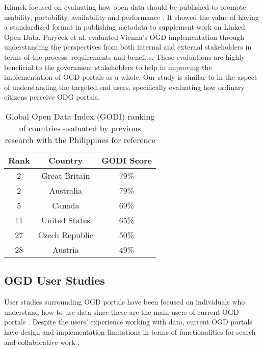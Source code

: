 \documentclass{sigchi}
\begin{document}
Kl{\'\i}mek focused on evaluating how open data should be published to promote usability, portability, availability and performance \cite{klimek2019dcat}. It showed the value of having a standardized format in publishing metadata to supplement work on Linked Open Data. Parycek et al. \cite{Parycek2014} evaluated Vienna's OGD implementation through understanding the perspectives from both internal and external stakeholders in terms of the process, requirements and benefits. These evaluations are highly beneficial to the government stakeholders to help in improving the implementation of OGD portals as a whole. Our study is similar to \cite{Parycek2014} in the aspect of understanding the targeted end users, specifically evaluating how ordinary citizens perceive ODG portals.

\begin{table}
    \centering
    \begin{tabular}{c c c}
         \textbf{Rank} & \textbf{Country} & \textbf{GODI Score} \\
         \midrule
         2 & Great Britain & 79\% \\
         2 & Australia & 79\% \\
         5 & Canada & 69\% \\
         11 & United States & 65\% \\
         27 & Czech Republic & 50\% \\
         28 & Austria & 49\% \\ 
    \end{tabular}
    \caption{Global Open Data Index (GODI) ranking of countries evaluated by previous research with the Philippines for reference}
    \label{tab:godi}
\end{table}

\subsection{OGD User Studies}
User studies surrounding OGD portals have been focused on individuals who understand how to use data since these are the main users of current OGD portals \cite{choi2017characteristics,kacprzak2019characterising, koesten2019collaborative, koesten2017trials}. Despite the users' experience working with data, current OGD portals have design and implementation limitations in terms of functionalities for search \cite{kacprzak2019characterising, koesten2017trials} and collaborative work \cite{choi2017characteristics, koesten2019collaborative}.
\end{document}

